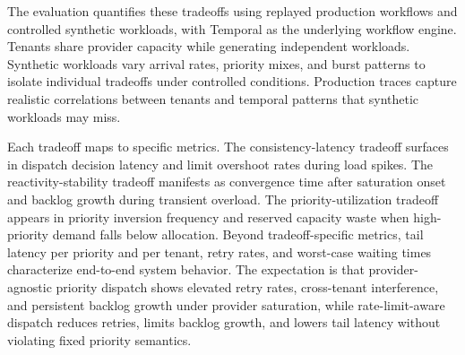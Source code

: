 \documentclass{article}
\begin{document}
The evaluation quantifies these tradeoffs using replayed production workflows and controlled synthetic workloads, with Temporal as the underlying workflow engine. Tenants share provider capacity while generating independent workloads. Synthetic workloads vary arrival rates, priority mixes, and burst patterns to isolate individual tradeoffs under controlled conditions. Production traces capture realistic correlations between tenants and temporal patterns that synthetic workloads may miss.

Each tradeoff maps to specific metrics. The consistency-latency tradeoff surfaces in dispatch decision latency and limit overshoot rates during load spikes. The reactivity-stability tradeoff manifests as convergence time after saturation onset and backlog growth during transient overload. The priority-utilization tradeoff appears in priority inversion frequency and reserved capacity waste when high-priority demand falls below allocation. Beyond tradeoff-specific metrics, tail latency per priority and per tenant, retry rates, and worst-case waiting times characterize end-to-end system behavior. The expectation is that provider-agnostic priority dispatch shows elevated retry rates, cross-tenant interference, and persistent backlog growth under provider saturation, while rate-limit-aware dispatch reduces retries, limits backlog growth, and lowers tail latency without violating fixed priority semantics.
\end{document}
